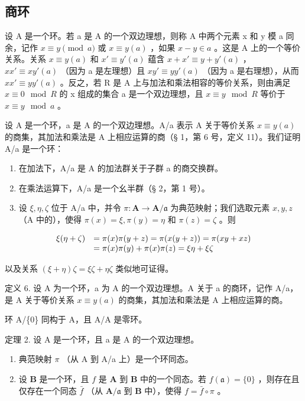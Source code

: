 \subsection{商环}

设 A 是一个环。若 a 是 A 的一个双边理想，则称 A 中两个元素 x 和 y 模 a 同余，记作 \(x \equiv y \pmod{a}\) 或 \(x \equiv y(a)\) ，如果 \(x - y \in a\) 。这是 A 上的一个等价关系。关系 \(x \equiv y(a)\) 和 \(x' \equiv y'(a)\) 蕴含 \(x + x' \equiv y + y'(a)\) ， \(xx' \equiv xy'(a)\) （因为 a 是左理想）且 \(xy' \equiv yy'(a)\) （因为 a 是右理想），从而 \(xx' \equiv yy'(a)\) 。反之，若 R 是 A 上与加法和乘法相容的等价关系，则由满足 \(x \equiv 0 \mod R\) 的 x 组成的集合 a 是一个双边理想，且 \(x \equiv y \mod R\) 等价于 \(x \equiv y \mod a\) 。

设 A 是一个环，a 是 A 的一个双边理想。A/a 表示 A 关于等价关系 \(x \equiv y(a)\) 的商集，其加法和乘法是 A 上相应运算的商（§ 1，第 6 号，定义 11）。我们证明 A/a 是一个环：

\begin{enumerate}
\def\labelenumi{(\alph{enumi})}
\item
  在加法下，A/a 是 A 的加法群关于子群 a 的商交换群。
\item
  在乘法运算下，A/a 是一个幺半群（§ 2，第 1 号）。
\item
  设 \(\xi, \eta, \zeta\) 位于 A/a 中，并令 \(\pi: \mathbf{A} \to \mathbf{A}/\mathfrak{a}\) 为典范映射；我们选取元素 \(x, y, z\) （A 中的），使得 \(\pi(x) = \xi, \pi(y) = \eta\) 和 \(\pi(z) = \zeta\) 。则
\end{enumerate}

\[
\begin{array}{r l} \xi (\eta + \zeta) & = \pi (x) \pi (y + z) = \pi (x (y + z)) = \pi (x y + x z) \\ & = \pi (x) \pi (y) + \pi (x) \pi (z) = \xi \eta + \xi \zeta \end{array}
\]

以及关系 \((\xi + \eta)\zeta = \xi \zeta + \eta \zeta\) 类似地可证得。

定义 6. 设 A 为一个环，a 为 A 的一个双边理想。A 关于 a 的商环，记作 A/a，是 A 关于等价关系 \(x \equiv y(a)\) 的商集，其加法和乘法是 A 上相应运算的商。

环 A/\{0\} 同构于 A，且 A/A 是零环。

定理 2. 设 A 是一个环，且 a 是 A 的一个双边理想。

\begin{enumerate}
\def\labelenumi{(\alph{enumi})}
\item
  典范映射 \(\pi\) （从 A 到 A/a 上）是一个环同态。
\item
  设 \(\mathbf{B}\) 是一个环，且 \(f\) 是 \(\mathbf{A}\) 到 \(\mathbf{B}\) 中的一个同态。若 \(f(\mathfrak{a}) = \{0\}\) ，则存在且仅存在一个同态 \(\bar{f}\) （从 \(\mathbf{A} / \mathfrak{a}\) 到 \(\mathbf{B}\) 中），使得 \(f = \bar{f} \circ \pi\) 。
\end{enumerate}

